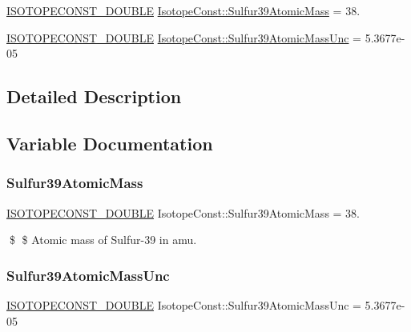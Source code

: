 \begin{DoxyCompactItemize}
\item 
\mbox{\hyperlink{group___isotope_const-_macros_ga8f45a7272ce02c0b4c65c44636ed719a}{I\+S\+O\+T\+O\+P\+E\+C\+O\+N\+S\+T\+\_\+\+D\+O\+U\+B\+LE}} \mbox{\hyperlink{group___isotope_const-_sulfur-_s39_gaeb5638e5e7d908a73866cccd358d503e}{Isotope\+Const\+::\+Sulfur39\+Atomic\+Mass}} = 38.
\item 
\mbox{\hyperlink{group___isotope_const-_macros_ga8f45a7272ce02c0b4c65c44636ed719a}{I\+S\+O\+T\+O\+P\+E\+C\+O\+N\+S\+T\+\_\+\+D\+O\+U\+B\+LE}} \mbox{\hyperlink{group___isotope_const-_sulfur-_s39_ga9356375c225a8ece0b3129ccae505e5e}{Isotope\+Const\+::\+Sulfur39\+Atomic\+Mass\+Unc}} = 5.\+3677e-\/05
\end{DoxyCompactItemize}


\subsection{Detailed Description}


\subsection{Variable Documentation}
\mbox{\label{group___isotope_const-_sulfur-_s39_gaeb5638e5e7d908a73866cccd358d503e}} 
\subsubsection{\texorpdfstring{Sulfur39\+Atomic\+Mass}{Sulfur39AtomicMass}}
{\footnotesize\ttfamily \mbox{\hyperlink{group___isotope_const-_macros_ga8f45a7272ce02c0b4c65c44636ed719a}{I\+S\+O\+T\+O\+P\+E\+C\+O\+N\+S\+T\+\_\+\+D\+O\+U\+B\+LE}} Isotope\+Const\+::\+Sulfur39\+Atomic\+Mass = 38.}

\$ \$ Atomic mass of Sulfur-\/39 in amu. \mbox{\label{group___isotope_const-_sulfur-_s39_ga9356375c225a8ece0b3129ccae505e5e}} 
\subsubsection{\texorpdfstring{Sulfur39\+Atomic\+Mass\+Unc}{Sulfur39AtomicMassUnc}}
{\footnotesize\ttfamily \mbox{\hyperlink{group___isotope_const-_macros_ga8f45a7272ce02c0b4c65c44636ed719a}{I\+S\+O\+T\+O\+P\+E\+C\+O\+N\+S\+T\+\_\+\+D\+O\+U\+B\+LE}} Isotope\+Const\+::\+Sulfur39\+Atomic\+Mass\+Unc = 5.\+3677e-\/05}

